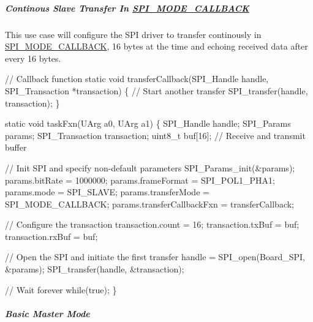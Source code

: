 \subparagraph*{Continous Slave Transfer In \hyperlink{_s_p_i_8h_ab9ea76c6529d6076eee5e1c4a5a92c6fa5631e69925c47a62a261c78ebbda39fb}{S\+P\+I\+\_\+\+M\+O\+D\+E\+\_\+\+C\+A\+L\+L\+B\+A\+C\+K}\label{_s_p_i_c_c26_x_x_d_m_a_8h_USE_CASE_CST}%
\hypertarget{_s_p_i_c_c26_x_x_d_m_a_8h_USE_CASE_CST}{}%
}

This use case will configure the S\+P\+I driver to transfer continously in \hyperlink{_s_p_i_8h_ab9ea76c6529d6076eee5e1c4a5a92c6fa5631e69925c47a62a261c78ebbda39fb}{S\+P\+I\+\_\+\+M\+O\+D\+E\+\_\+\+C\+A\+L\+L\+B\+A\+C\+K}, 16 bytes at the time and echoing received data after every 16 bytes. 
\begin{DoxyCode}
\textcolor{comment}{// Callback function}
\textcolor{keyword}{static} \textcolor{keywordtype}{void} transferCallback(SPI_Handle handle, SPI_Transaction *transaction)
\{
    \textcolor{comment}{// Start another transfer}
    SPI_transfer(handle, transaction);
\}

\textcolor{keyword}{static} \textcolor{keywordtype}{void} taskFxn(UArg a0, UArg a1)
\{
    SPI_Handle handle;
    SPI_Params params;
    SPI_Transaction transaction;
    uint8\_t buf[16];                  \textcolor{comment}{// Receive and transmit buffer}

    \textcolor{comment}{// Init SPI and specify non-default parameters}
    SPI_Params_init(&params);
    params.bitRate             = 1000000;
    params.frameFormat         = SPI_POL1_PHA1;
    params.mode                = SPI_SLAVE;
    params.transferMode        = SPI_MODE_CALLBACK;
    params.transferCallbackFxn = transferCallback;

    \textcolor{comment}{// Configure the transaction}
    transaction.count = 16;
    transaction.txBuf = buf;
    transaction.rxBuf = buf;

    \textcolor{comment}{// Open the SPI and initiate the first transfer}
    handle = SPI_open(Board\_SPI, &params);
    SPI_transfer(handle, &transaction);

    \textcolor{comment}{// Wait forever}
    \textcolor{keywordflow}{while}(\textcolor{keyword}{true});
\}
\end{DoxyCode}


\subparagraph*{Basic Master Mode}

